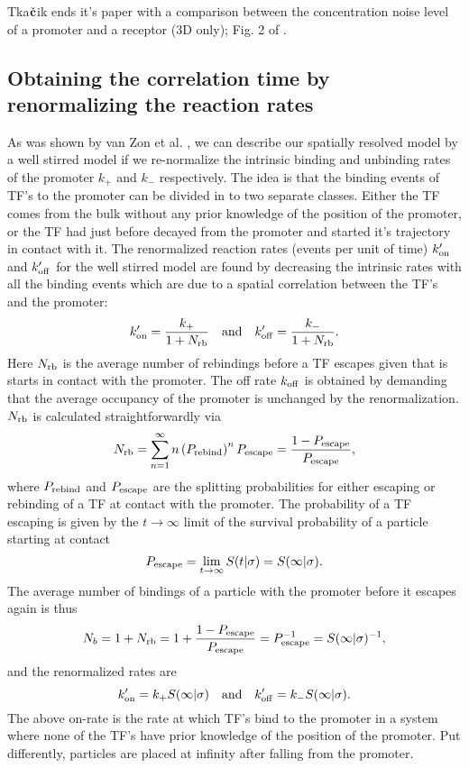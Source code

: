 Tka$\check{\bf c}$ik ends it's paper with a comparison between the concentration noise level of a promoter and a receptor (3D only); Fig. 2 of \cite{Tkacik2009}. 


\subsection{Obtaining the correlation time by renormalizing the reaction rates}
As was shown by van Zon et al. \cite{VanZon2006}, we can describe our spatially resolved model by a well stirred model if we re-normalize the intrinsic binding and unbinding rates of the promoter $k_+$ and $k_-$ respectively. The idea is that the binding events of TF's to the promoter can be divided in to two separate classes. Either the TF comes from the bulk without any prior knowledge of the position of the promoter, or the TF had just before decayed from the promoter and started it's trajectory in contact with it. The renormalized reaction rates (events per unit of time) $k'_{\rm on}$ and $k'_{\rm off}$ for the well stirred model are found by decreasing the intrinsic rates with all the binding events which are due to a spatial correlation between the TF's and the promoter:
\begin{equation}
 k'_{\rm on} = \frac{k_+}{1 + N_{\rm rb}} \quad \text{and} \quad k'_{\rm off} = \frac{k_-}{1 + N_{\rm rb}}.
\end{equation}
Here $N_{\rm rb}$ is the average number of rebindings before a TF escapes given that is starts in contact with the promoter. The off rate $k_{\rm off}$ is obtained by demanding that the average occupancy of the promoter is unchanged by the renormalization. $N_{\rm rb}$ is calculated straightforwardly via
\begin{equation}
 N_{\rm rb} = \sum_{n=1}^{\infty} n \left( P_{\rm rebind} \right)^n P_{\rm escape} = \frac{1-P_{\rm escape}}{P_{\rm escape}},
\end{equation}
where $P_{\rm rebind}$ and $P_{\rm escape}$ are the splitting probabilities for either escaping or rebinding of a TF at contact with the promoter. The probability of a TF escaping is given by the $t \to \infty$ limit of the survival probability of a particle starting at contact 
\begin{equation}
 P_{\rm escape} = \lim_{t \to \infty} S(t|\sigma) = S(\infty|\sigma).
\end{equation}
The average number of bindings of a particle with the promoter before it escapes again is thus
\begin{equation}
 N_b = 1 + N_{\rm rb} = 1 + \frac{1 - P_{\rm escape}}{P_{\rm escape}} = P_{\rm escape}^{-1} = S(\infty|\sigma)^{-1},
\end{equation}
and the renormalized rates are
\begin{equation}
 k'_{\rm on} = k_+ S(\infty|\sigma) \quad \text{and} \quad  k'_{\rm off} = k_- S(\infty|\sigma).
 \elabel{RenRates}
\end{equation}
The above on-rate is the rate at which TF's bind to the promoter in a system where none of the TF's have prior knowledge of the position of the promoter. Put differently, particles are placed at infinity after falling from the promoter. 

